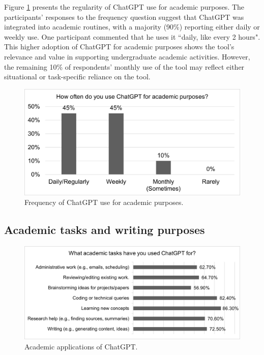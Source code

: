 \documentclass[english]{textolivre}
\begin{document}
Figure \ref{fig-2} presents the regularity of ChatGPT use for academic purposes. The participants’ responses to the frequency question suggest that ChatGPT was integrated into academic routines, with a majority (90\%) reporting either daily or weekly use. One participant commented that he uses it ``daily, like every 2 hours". This higher adoption of ChatGPT for academic purposes shows the tool’s relevance and value in supporting undergraduate academic activities. However, the remaining 10\% of respondents’ monthly use of the tool may reflect either situational or task-specific reliance on the tool.

\begin{figure}[h!]
    \centering
    \begin{minipage}{0.80\linewidth}
    \includegraphics[width=\linewidth]{Imagens/FIGURA2.png}
    \caption{Frequency of ChatGPT use for academic purposes.}
    \label{fig-2}
    \end{minipage}
\end{figure}



\subsection{Academic tasks and writing purposes}

\begin{figure}[h!]
    \centering
    \begin{minipage}{0.80\linewidth}
    \includegraphics[width=\linewidth]{Imagens/FIGURA3.png}
    \caption{Academic applications of ChatGPT.}
    \label{fig-3}
    \end{minipage}
\end{figure}
\end{document}
